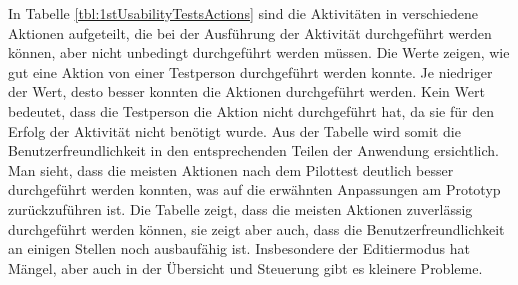 In Tabelle \ref{tbl:1stUsabilityTestsActions} sind die Aktivitäten in verschiedene Aktionen aufgeteilt, die bei der Ausführung der Aktivität durchgeführt werden können, aber nicht unbedingt durchgeführt werden müssen. Die Werte zeigen, wie gut eine Aktion von einer Testperson durchgeführt werden konnte. Je niedriger der Wert, desto besser konnten die Aktionen durchgeführt werden. Kein Wert bedeutet, dass die Testperson die Aktion nicht durchgeführt hat, da sie für den Erfolg der Aktivität nicht benötigt wurde. Aus der Tabelle wird somit die Benutzerfreundlichkeit in den entsprechenden Teilen der Anwendung ersichtlich. Man sieht, dass die meisten Aktionen nach dem Pilottest deutlich besser durchgeführt werden konnten, was auf die erwähnten Anpassungen am Prototyp zurückzuführen ist. Die Tabelle zeigt, dass die meisten Aktionen zuverlässig durchgeführt werden können, sie zeigt aber auch, dass die Benutzerfreundlichkeit an einigen Stellen noch ausbaufähig ist. Insbesondere der Editiermodus hat Mängel, aber auch in der Übersicht und Steuerung gibt es kleinere Probleme.


